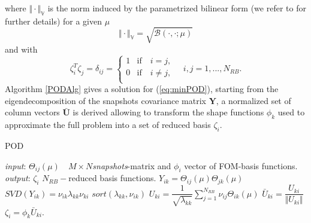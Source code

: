 \documentclass[3p]{article}
\begin{document}
where $\Vert\cdot\Vert_{\mathbb{V}}$ is the norm induced by the parametrized bilinear form (we refer to \cite{Rozza2009} for further details) for a given $\mu$
\begin{equation}
\Vert\cdot\Vert_{\mathbb{V}} = \sqrt{\mathcal{B}(\cdot, \cdot; \mu)}
\end{equation}
and with
\begin{equation}
\zeta_{i}^{T}\zeta_{j} = \delta_{ij} =
    \begin{cases}
      1 &\text{if}\quad i=j, \\
      0 &\text{if}\quad i \neq j, \\
    \end{cases}
   \quad i,j=1,...,N_{RB}.
\end{equation}
\indent Algorithm \ref{PODAlg} gives a solution for (\ref{eq:minPOD}), starting from the eigendecomposition of the snapshots covariance matrix $\mathbf{Y}$, a normalized set of column vectors $\mathbf{\bar{U}}$ is derived allowing to transform the shape functions $\phi_{k}$ used to approximate the full problem into a set of reduced basis $\zeta_{i}$. 
\begin{algorithm}
\caption{POD}
\begin{algorithmic}[1]
\State \textit{input}: $\Theta_{i j}(\mu) \quad M\times N $\textit{snapshots}-matrix and $\phi_{i}$ vector of FOM-basis functions.
\State \textit{output}: $\zeta_{i}$ $N_{RB}-$reduced basis functions.
\State $Y_{ik}=\Theta_{ij}(\mu)\Theta_{jk}(\mu)$ 
\State $SVD(Y_{ik})=\nu_{ik}\lambda_{kk}\nu_{ki}$
\State $sort(\lambda_{kk}, \nu_{ik})$
\EndIf
\State $U_{ki}=\dfrac{1}{\sqrt{\lambda_{kk}}}\sum_{j=1}^{N_{RB}}\nu_{ij}\Theta_{ik}(\mu)$ 
\State $\bar{U}_{ki}=\dfrac{U_{ki}}{\Vert U_{ki}\Vert}$ 
\State $\zeta_{i}=\phi_{k}\bar{U}_{ki}$.
\end{algorithmic}
\label{PODAlg}
\end{algorithm}

\end{document}
